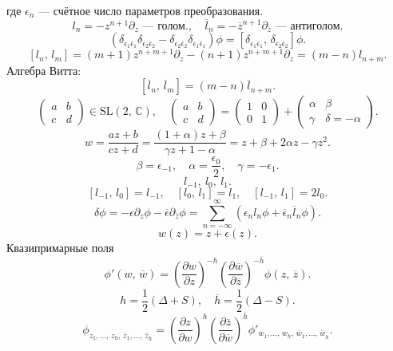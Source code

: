 \documentclass[a4paper]{article}
\begin{document}
где $\epsilon_n$ --- счётное число параметров преобразования.
\[
l_n= - z^{n+1}\partial_{z}\text{ --- голом.},\quad \overline{l}_n=- \overline{z}^{n+1}
\partial_{\overline{z}}\text{ --- антиголом.}
\] 
\[
	\left( \delta_{\epsilon_1\overline{\epsilon }_1}
		\delta_{\epsilon_2 \overline{\epsilon }_2}-
		\delta_{\epsilon_2 \overline{\epsilon }_2}
\delta_{\epsilon_1\overline{\epsilon }_1}
	\right) \phi=
	\left[ \delta_{\epsilon_1\overline{\epsilon }_1},\,
	\delta_{\epsilon_2\overline{\epsilon }_2}\right] \phi
.\] 
\[
	\left[ l_n,\,l_m \right] =(m+1)z^{n+m+1}\partial_z-(n+1)
	z^{n+m +1}\partial_z =(m-n) l_{n+m}
.\] 
Алгебра Витта:
\[
	\left[ \overline{l}_n,\,\overline{l}_m \right] =(m-n) \overline{l}_{n+m}
.\] 
\[
	\begin{pmatrix} a & b \\ c & d \end{pmatrix} \in 
	\text{SL}(2,\,\mathbb{C}),\quad
	\begin{pmatrix} a & b \\ c & d \end{pmatrix} =
	\begin{pmatrix} 1 & 0 \\ 0 & 1 \end{pmatrix} +
	\begin{pmatrix} \alpha & \beta \\ \gamma & \delta=-\alpha \end{pmatrix} 
.\] 
\[
	w= \frac{az+b}{cz+d}= \frac{(1+\alpha) z + \beta}{\gamma z+1 -\alpha}= z+ \beta +2 \alpha z-\gamma z^2
.\] 
\[
\beta=\epsilon_{-1},\quad \alpha= \frac{\epsilon_0}{2},\quad
\gamma=-\epsilon_1
.\] 
\[
l_{-1},\ l_0,\ l_1
.\] 
\[
\left[ l_{-1},\,l_0 \right] =l_{-1},\quad \left[ l_0,\,l_1 \right] =
l_1,\quad \left[ l_{-1},\,l_1 \right] =2 l_0
.\] 
\[
\delta \phi = -\epsilon \partial_z \phi - \overline{\epsilon }
\partial_{\overline{z}}\phi= \sum_{n=-\infty}^{\infty} \left( 
\epsilon_n l_n \phi + \overline{\epsilon }_n \overline{l}_n \phi\right) 
.\] 
\[
	w(z)= z+\epsilon(z)
.\] 
Квазипримарные поля
\[
	\phi'\left( w,\,\overline{w} \right) =
	\left( \frac{\partial w}{\partial z} \right)  ^{-h} 
	\left( \frac{\partial \overline{w}}{\partial \overline{z}}  \right) ^{-\overline{h}}\phi \left(z,\,\overline{z}\right)
.\] 
\[
	h=\frac{1}{2} (\Delta+S),\quad \overline{h}=\frac{1}{2}
	(\Delta -S)
.\] 
\[
	\phi_{z_1,\ldots,\,z_h,\,\overline{z}_1,\ldots,\,\overline{z}_{\overline{h}}}= \left( \frac{\partial z}{\partial w}  \right) ^h
	\left( \frac{\partial \overline{z}}{\partial \overline{w}}  \right) ^{\overline{h}} \phi'_{w_1,\ldots,\,w_h,\, \overline{w}_1,\ldots,\,\overline{w}_{\overline{h}}}
.\] 
\end{document}
